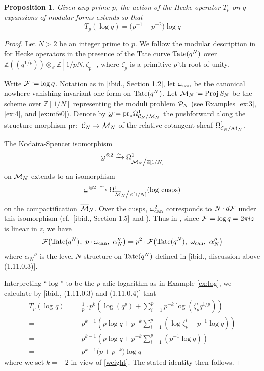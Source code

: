 \documentclass{gtpart}
\newtheorem{prop}[thm]{Proposition}
\theoremstyle{definition}
\theoremstyle{remark}
\def\co{\colon\thinspace}
\newcommand{\mb}[1]{\mathbb{#1}}
\newcommand{\Proj}{{\rm Proj\thinspace}}
\newcommand{\CC}{{\cal C}}
\newcommand{\CF}{{\cal F}}
\newcommand{\CM}{{\cal M}}
\newcommand{\CMB}{\overline {\cal M}}
\newcommand{\CP}{{\cal P}}
\newcommand{\BZ}{{\mb Z}}
\newcommand{\can}{{\rm can}}
\newcommand{\A}{\alpha}
\renewcommand{\o}{\omega}
\newcommand{\ou}{\underline{\omega\!}}
\newcommand{\ce}{\coloneqq}
\newcommand{\lp}{(\!(}
\newcommand{\rp}{)\!)}
\renewcommand{\=}{\approx}
\renewcommand{\-}{\sim}
\newcommand{\Tate}{{\rm Tate}}
\numberwithin{equation}{section}
\numberwithin{thm}{section}
\begin{document}
\begin{prop}
 \label{prop:logq}
 Given any prime $p$, the action of the Hecke operator $T_p$ on $q$-expansions of modular forms extends so that 
 \[
  T_p (\log q) = \big( p^{-1} + p^{-2} \big) \log q 
 \]
\end{prop}
\begin{proof}
 Let $N > 2$ be an integer prime to $p$.  
 We follow the modular description in \cite[Section 1.11]{padicprop} for Hecke operators in the presence of the Tate curve 
 $\Tate(q^N)$ over $\BZ \lp q^{1 / p} \rp \otimes_\BZ \BZ [1 / p N, \zeta_p]$, where $\zeta_p$ is a primitive $p$'th root of unity.  

 Write $\CF \ce \log q$.  
 Notation as in [ibid., Section 1.2], let $\o_\can$ be the canonical nowhere-vanishing invariant one-form on $\Tate(q^N)$.  
 Let $\CM_N \ce \Proj S_N$ be the scheme over $\BZ[1/N]$ representing the moduli problem $\CP_N$ (see Examples \ref{ex:3}, \ref{ex:4}, and \ref{ex:mfe0}).  
 Denote by $\ou \ce {\rm pr}_* \Omega^1_{\CC_N/\CM_N}$ the pushforward along the structure morphism ${\rm pr} \co \CC_N \to \CM_N$ of the relative cotangent sheaf $\Omega^1_{\CC_N/\CM_N}$.  

 The Kodaira-Spencer isomorphism 
 \[
  \ou^{~\! \otimes 2} \xrightarrow{\sim} \Omega^1_{\CM_N \big/ \BZ[1/N]} 
 \]
 on $\CM_N$ extends to an isomorphism 
 \[
  \ou^{~\! \otimes 2} \xrightarrow{\sim} \Omega^1_{\CMB_N \big/ \BZ[1/N]} (\text{log cusps}) 
 \]
 on the compactification $\CMB_N$.  
 Over the cusps, $\o_\can^2$ corresponds to $N \cdot d\CF$ under this isomorphism 
 (cf.~[ibid., Section 1.5] and \cite[Theorem 10.13.11]{KM}).  
 Thus in \cite[(1.11.0.4)]{padicprop}, since $\CF = \log q = 2 \pi i z$ is linear in $z$, we have 
 \begin{equation}
  \label{weight}
  \CF \big( \Tate(q^N), ~ p \cdot \o_\can, ~ \A_N'' \big) = p^2 \cdot \CF \big( \Tate(q^N), ~ \o_\can, ~ \A_N'' \big) 
 \end{equation}
 where $\A_N''$ is the level-$N$ structure on $\Tate(q^N)$ defined in [ibid., discussion above (1.11.0.3)].  

 Interpreting ``$\log$'' to be the $p$-adic logarithm as in Example \ref{ex:log}, 
 we calculate by [ibid., (1.11.0.3) and (1.11.0.4)] that 
 \begin{equation}
  \label{Tplogq}
  \begin{split}
   T_p (\log q) = & ~ \frac{1}{p}\cdot p^k \left( \log(q^p) + \sum_{i=1}^p p^{-k} \log(\zeta_p^i q^{1/p}) \right) \\
                = & ~ p^{k - 1} \left( p \log q + p^{-k} \sum_{i=1}^p (\log \zeta_p^i + p^{-1} \log q) \right) \\
                = & ~ p^{k - 1} \left( p \log q + p^{-k} \sum_{i=1}^p (p^{-1} \log q) \right) \\
                = & ~ p^{k - 1} \big( p + p^{-k} \big) \log q 
  \end{split}
 \end{equation}
 where we set $k = -2$ in view of \eqref{weight}.  The stated identity then follows.  
\end{proof}
\end{document}
